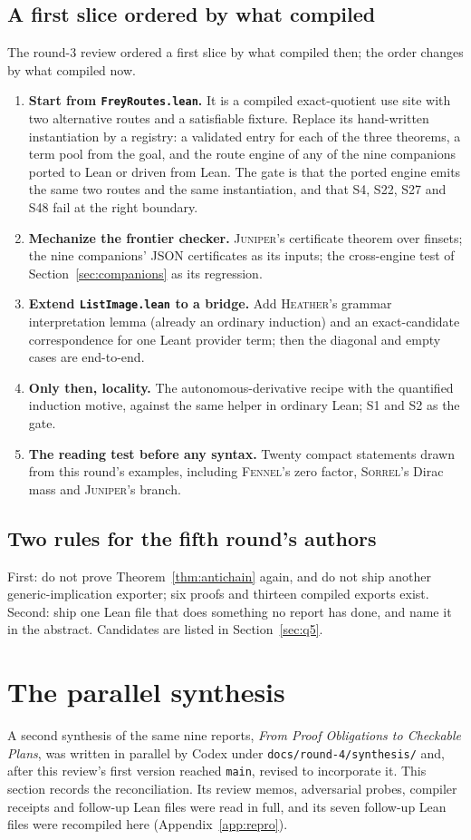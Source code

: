 \documentclass[11pt,a4paper]{article}
\newcommand{\code}[1]{\nolinkurl{#1}}
\newcommand{\Fe}{\textsc{Fennel}}
\newcommand{\He}{\textsc{Heather}}
\newcommand{\Ju}{\textsc{Juniper}}
\newcommand{\So}{\textsc{Sorrel}}
\theoremstyle{definition}
\theoremstyle{plain}
\begin{document}
\subsection{A first slice ordered by what compiled}\label{sec:slice}
The round-3 review ordered a first slice by what compiled then; the order changes by what compiled now.
\begin{enumerate}
\item \textbf{Start from \code{FreyRoutes.lean}.} It is a compiled exact-quotient use site with two alternative routes and a satisfiable fixture. Replace its hand-written instantiation by a registry: a validated entry for each of the three theorems, a term pool from the goal, and the route engine of any of the nine companions ported to Lean or driven from Lean. The gate is that the ported engine emits the same two routes and the same instantiation, and that S4, S22, S27 and S48 fail at the right boundary.
\item \textbf{Mechanize the frontier checker.} \Ju's certificate theorem over finsets; the nine companions' JSON certificates as its inputs; the cross-engine test of Section~\ref{sec:companions} as its regression.
\item \textbf{Extend \code{ListImage.lean} to a bridge.} Add \He's grammar interpretation lemma (already an ordinary induction) and an exact-candidate correspondence for one Leant provider term; then the diagonal and empty cases are end-to-end.
\item \textbf{Only then, locality.} The autonomous-derivative recipe with the quantified induction motive, against the same helper in ordinary Lean; S1 and S2 as the gate.
\item \textbf{The reading test before any syntax.} Twenty compact statements drawn from this round's examples, including \Fe's zero factor, \So's Dirac mass and \Ju's branch.
\end{enumerate}

\subsection{Two rules for the fifth round's authors}
First: do not prove Theorem~\ref{thm:antichain} again, and do not ship another generic-implication exporter; six proofs and thirteen compiled exports exist. Second: ship one Lean file that does something no report has done, and name it in the abstract. Candidates are listed in Section~\ref{sec:q5}.

\section{The parallel synthesis}\label{sec:parallel}
A second synthesis of the same nine reports, \emph{From Proof Obligations to Checkable Plans}, was written in parallel by Codex under \code{docs/round-4/synthesis/} and, after this review's first version reached \code{main}, revised to incorporate it. This section records the reconciliation. Its review memos, adversarial probes, compiler receipts and follow-up Lean files were read in full, and its seven follow-up Lean files were recompiled here (Appendix~\ref{app:repro}).
\end{document}
